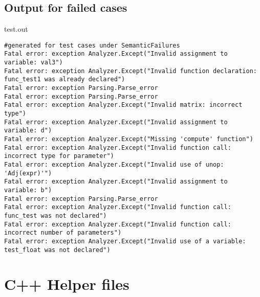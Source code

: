 \subsection{Output for failed cases}
test.out
\begin{lstlisting}
#generated for test cases under SemanticFailures
Fatal error: exception Analyzer.Except("Invalid assignment to variable: val3")
Fatal error: exception Analyzer.Except("Invalid function declaration: func_test1 was already declared")
Fatal error: exception Parsing.Parse_error
Fatal error: exception Parsing.Parse_error
Fatal error: exception Analyzer.Except("Invalid matrix: incorrect type")
Fatal error: exception Analyzer.Except("Invalid assignment to variable: d")
Fatal error: exception Analyzer.Except("Missing 'compute' function")
Fatal error: exception Analyzer.Except("Invalid function call: incorrect type for parameter")
Fatal error: exception Analyzer.Except("Invalid use of unop: 'Adj(expr)'")
Fatal error: exception Analyzer.Except("Invalid assignment to variable: b")
Fatal error: exception Parsing.Parse_error
Fatal error: exception Analyzer.Except("Invalid function call: func_test was not declared")
Fatal error: exception Analyzer.Except("Invalid function call: incorrect number of parameters")
Fatal error: exception Analyzer.Except("Invalid use of a variable: test_float was not declared")
\end{lstlisting}
\section{C++ Helper files}
